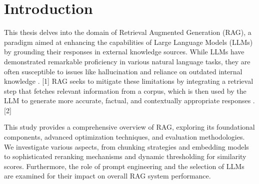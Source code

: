 \chapter{Introduction}
\label{chap:introduction}

This thesis delves into the domain of Retrieval Augmented Generation (RAG), a paradigm aimed at enhancing the capabilities of Large Language Models (LLMs) by grounding their responses in external knowledge sources. While LLMs have demonstrated remarkable proficiency in various natural language tasks, they are often susceptible to issues like hallucination and reliance on outdated internal knowledge \autocite{survey_rag_2024_chen}. [1] RAG seeks to mitigate these limitations by integrating a retrieval step that fetches relevant information from a corpus, which is then used by the LLM to generate more accurate, factual, and contextually appropriate responses \autocite{rag_survey_2024_ralm}. [2]

This study provides a comprehensive overview of RAG, exploring its foundational components, advanced optimization techniques, and evaluation methodologies. We investigate various aspects, from chunking strategies and embedding models to sophisticated reranking mechanisms and dynamic thresholding for similarity scores. Furthermore, the role of prompt engineering and the selection of LLMs are examined for their impact on overall RAG system performance.